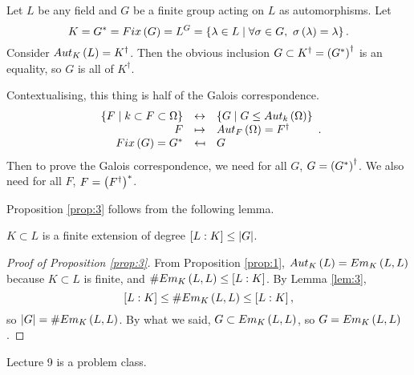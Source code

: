 \begin{proposition}
\label{prop:3}
Let $ L $ be any field and $ G $ be a finite group acting on $ L $ as automorphisms. Let
$$ K = G^* = Fix\left( G \right) = L^G = \left\{ \lambda \in L \mid \forall \sigma \in G, \ \sigma\left( \lambda \right) = \lambda \right\}. $$
Consider $ Aut_K\left( L \right) = K^\dagger $. Then the obvious inclusion $ G \subset K^\dagger = \left( G^* \right)^\dagger $ is an equality, so $ G $ is all of $ K^\dagger $.
\end{proposition}

\begin{remark*}
Contextualising, this thing is half of the Galois correspondence.
$$
\begin{array}{rcl}
\left\{ F \mid k \subset F \subset \Omega \right\} & \leftrightarrow & \left\{ G \mid G \le Aut_k\left( \Omega \right) \right\} \\
F & \mapsto & Aut_F\left( \Omega \right) = F^\dagger \\
Fix\left( G \right) = G^* & \mapsfrom & G
\end{array}.
$$
Then to prove the Galois correspondence, we need for all $ G $, $ G = \left( G^* \right)^\dagger $. We also need for all $ F $, $ F = \left( F^\dagger \right)^* $.
\end{remark*}

Proposition \ref{prop:3} follows from the following lemma.

\begin{lemma}
\label{lem:3}
$ K \subset L $ is a finite extension of degree $ \left[ L : K \right] \le \left\lvert G \right\rvert $.
\end{lemma}

\begin{proof}[Proof of Proposition \ref{prop:3}]
From Proposition \ref{prop:1}, $ Aut_K\left( L \right) = Em_K\left( L, L \right) $ because $ K \subset L $ is finite, and $ \#Em_K\left( L, L \right) \le \left[ L : K \right] $. By Lemma \ref{lem:3},
$$ \left[ L : K \right] \le \#Em_K\left( L, L \right) \le \left[ L : K \right], $$
so $ \left\lvert G \right\rvert = \#Em_K\left( L, L \right) $. By what we said, $ G \subset Em_K\left( L, L \right) $, so $ G = Em_K\left( L, L \right) $.
\end{proof}


Lecture 9 is a problem class.

\pagebreak


